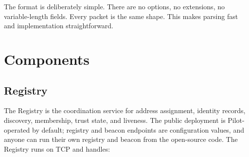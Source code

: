 \documentclass[11pt,a4paper]{article}
\begin{document}
The format is deliberately simple. There are no options, no extensions, no variable-length fields. Every packet is the same shape. This makes parsing fast and implementation straightforward.

\section{Components}

\subsection{Registry}

The Registry is the coordination service for address assignment, identity records, discovery, membership, trust state, and liveness. The public deployment is Pilot-operated by default; registry and beacon endpoints are configuration values, and anyone can run their own registry and beacon from the open-source code. The Registry runs on TCP and handles:
\end{document}
